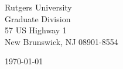 \begin{minipage}{0.49\textwidth}
\begin{flushleft}
\noindent
Rutgers University\\
Graduate Division\\
57 US Highway 1\\
New Brunswick, NJ 08901-8554\\

\end{flushleft}
\end{minipage}
\begin{minipage}{0.47\textwidth}
\begin{flushright}
\today
\end{flushright}
\end{minipage} \\

\newcommand{\univ}{Rutgers University}
\newcommand{\univshort}{Rutgers}
\newcommand{\degree}{Ph.D. degree in Computer Science}
\newcommand{\dept}{Computer Science}



